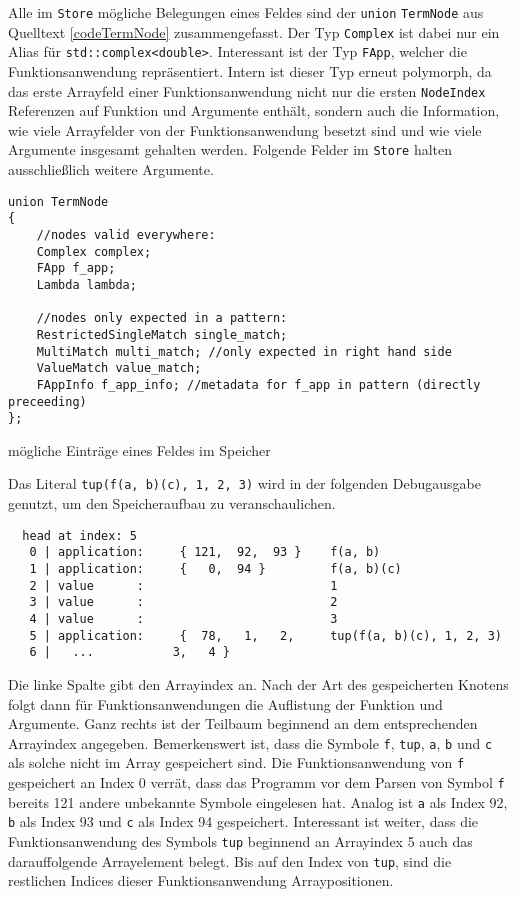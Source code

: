 Alle im \verb|Store| mögliche Belegungen eines Feldes sind der \verb|union| \verb|TermNode| aus Quelltext \ref{codeTermNode} zusammengefasst. Der Typ \verb|Complex| ist dabei nur ein Alias für \verb|std::complex<double>|. Interessant ist der Typ \verb|FApp|, welcher die Funktionsanwendung repräsentiert. Intern ist dieser Typ erneut polymorph, da das erste Arrayfeld einer Funktionsanwendung nicht nur die ersten \verb|NodeIndex| Referenzen auf Funktion und Argumente enthält, sondern auch die Information, wie viele Arrayfelder von der Funktionsanwendung besetzt sind und wie viele Argumente insgesamt gehalten werden. Folgende Felder im \verb|Store| halten ausschließlich weitere Argumente.


\begin{listing}
\footnotesize
\begin{verbatim}
union TermNode 
{
    //nodes valid everywhere:
    Complex complex;
    FApp f_app;
    Lambda lambda;
    
    //nodes only expected in a pattern:
    RestrictedSingleMatch single_match;
    MultiMatch multi_match; //only expected in right hand side
    ValueMatch value_match;
    FAppInfo f_app_info; //metadata for f_app in pattern (directly preceeding)
};
\end{verbatim}
\caption{mögliche Einträge eines Feldes im Speicher}
\label{codeTermNode}
\end{listing}



\begin{beispiel} \label{bspREPLliteral}
Das Literal \verb|tup(f(a, b)(c), 1, 2, 3)| wird in der folgenden Debugausgabe genutzt, um den Speicheraufbau zu veranschaulichen.
\begin{unbreakable}
\begin{verbatim}
  head at index: 5
   0 | application:     { 121,  92,  93 }    f(a, b)
   1 | application:     {   0,  94 }         f(a, b)(c)
   2 | value      :                          1
   3 | value      :                          2
   4 | value      :                          3
   5 | application:     {  78,   1,   2,     tup(f(a, b)(c), 1, 2, 3)
   6 |   ...           3,   4 }
\end{verbatim}
\end{unbreakable}
Die linke Spalte gibt den Arrayindex an. Nach der Art des gespeicherten Knotens folgt dann für Funktionsanwendungen die Auflistung der Funktion und Argumente. Ganz rechts ist der Teilbaum beginnend an dem entsprechenden Arrayindex angegeben. Bemerkenswert ist, dass die Symbole \verb|f|, \verb|tup|, \verb|a|, \verb|b| und \verb|c| als solche nicht im Array gespeichert sind. Die Funktionsanwendung von \verb|f| gespeichert an Index 0 verrät, dass das Programm vor dem Parsen von Symbol \verb|f| bereits 121 andere unbekannte Symbole eingelesen hat. Analog ist \verb|a| als Index 92, \verb|b| als Index 93 und \verb|c| als Index 94 gespeichert. 
Interessant ist weiter, dass die Funktionsanwendung des Symbols \verb|tup| beginnend an Arrayindex 5 auch das darauffolgende Arrayelement belegt. Bis auf den Index von \verb|tup|, sind die restlichen Indices dieser Funktionsanwendung Arraypositionen. 
\end{beispiel}


